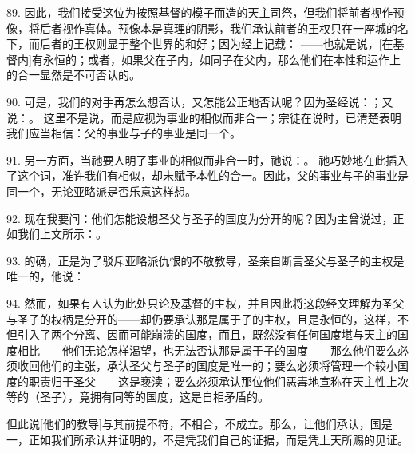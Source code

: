 89. 因此，我们接受这位为按照基督的模子而造的天主司祭，但我们将前者视作预像，将后者视作真体。预像本是真理的阴影，我们承认前者的王权只在一座城的名下，而后者的王权则显于整个世界的和好；因为经上记载： ——也就是说，[在基督内]有永恒的；或者，如果父在子内，如同子在父内，那么他们在本性和运作上的合一显然是不可否认的。\par

90. 可是，我们的对手再怎么想否认，又怎能公正地否认呢？因为圣经说：；又说：。  这里不是说，而是应视为事业的相似而非合一；宗徒在说时，已清楚表明我们应当相信：父的事业与子的事业是同一个。\par

91. 另一方面，当祂要人明了事业的相似而非合一时，祂说：。  祂巧妙地在此插入了这个词，准许我们有相似，却未赋予本性的合一。因此，父的事业与子的事业是同一个，无论亚略派是否乐意这样想。\par

\par

92. 现在我要问：他们怎能设想圣父与圣子的国度为分开的呢？因为主曾说过，正如我们上文所示：。 \par

93. 的确，正是为了驳斥亚略派仇恨的不敬教导，圣亲自断言圣父与圣子的主权是唯一的，他说： \par

94. 然而，如果有人认为此处只论及基督的主权，并且因此将这段经文理解为圣父与圣子的权柄是分开的——却仍要承认那是属于子的主权，且是永恒的，这样，不但引入了两个分离、因而可能崩溃的国度，而且，既然没有任何国度堪与天主的国度相比——他们无论怎样渴望，也无法否认那是属于子的国度——那么他们要么必须收回他们的主张，承认圣父与圣子的国度是唯一的；要么必须将管理一个较小国度的职责归于圣父——这是亵渎；要么必须承认那位他们恶毒地宣称在天主性上次等的（圣子），竟拥有同等的国度，这是自相矛盾的。\par

但此说[他们的教导]与其前提不符，不相合，不成立。那么，让他们承认，国是一，正如我们所承认并证明的，不是凭我们自己的证据，而是凭上天所赐的见证。\par

